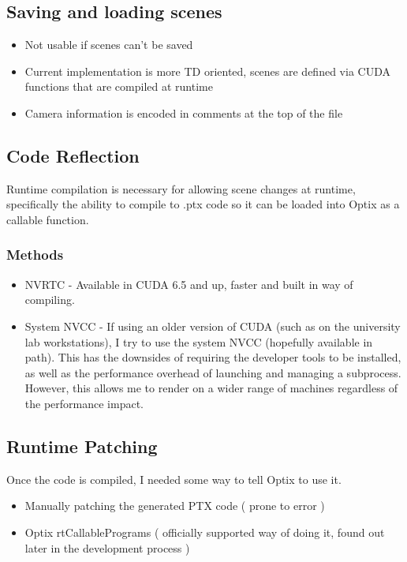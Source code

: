 \documentclass[11pt,a4paper,final,notitlepage]{report}
\begin{document}
\subsection{Saving and loading scenes}
\begin{itemize}
	\item Not usable if scenes can't be saved
	\item Current implementation is more TD oriented, scenes are defined via CUDA functions that are compiled at runtime
	\item Camera information is encoded in comments at the top of the file
\end{itemize}

\subsection{Code Reflection}
Runtime compilation is necessary for allowing scene changes at runtime, specifically the ability to compile to .ptx code so it can be loaded into Optix as a callable function.
\subsubsection{Methods}

\begin{itemize}
	\item NVRTC - Available in CUDA 6.5 and up, faster and built in way of compiling.
	\item System NVCC - If using an older version of CUDA (such as on the university lab workstations), I try to use the system NVCC (hopefully available in path). This has the downsides of requiring the developer tools to be installed, as well as the performance overhead of launching and managing a subprocess. However, this allows me to render on a wider range of machines regardless of the performance impact.
\end{itemize}

\subsection{Runtime Patching}
Once the code is compiled, I needed some way to tell Optix to use it.

\begin{itemize}
	\item Manually patching the generated PTX code ( prone to error )
	\item Optix rtCallablePrograms ( officially supported way of doing it, found out later in the development process )
\end{itemize}
\end{document}
